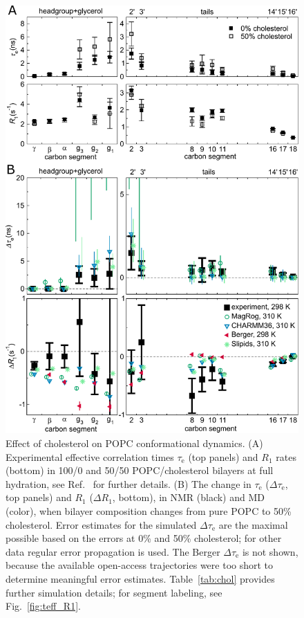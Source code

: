 \documentclass[journal=jcisd8,manuscript=article,layout=twocolumn]{achemso}
\begin{document}
\begin{figure}[h!]
	\centering
	\includegraphics[width=\columnwidth]{../Figs/cholesterol.pdf}  
	\caption{Effect of cholesterol on POPC conformational dynamics.
	(A) Experimental effective correlation times $\tau_\mathrm{e}$ (top panels) and $R_{1}$ rates (bottom) in 100/0 and 50/50 POPC/cholesterol bilayers at full hydration, see Ref.~ for further details.
	(B) The change in $\tau_\mathrm{e}$ ($\Delta\tau_\mathrm{e}$, top panels) and $R_{1}$ ($\Delta R_{1}$, bottom),
	in NMR (black) and MD (color), when bilayer composition changes from pure POPC to 50\% cholesterol.
	Error estimates for the simulated $\Delta\tau_\mathrm e$ are the maximal possible
	based on the errors at 0\% and 50\% cholesterol;
	for other data regular error propagation is used.
	The Berger $\Delta\tau_\mathrm{e}$ is not shown, because the available open-access trajectories were too short to determine meaningful error estimates.
	Table~\ref{tab:chol} provides further simulation details;
	for segment labeling, see Fig.~\ref{fig:teff_R1}.
	}
	\label{fig:chol}
\end{figure}
\end{document}
